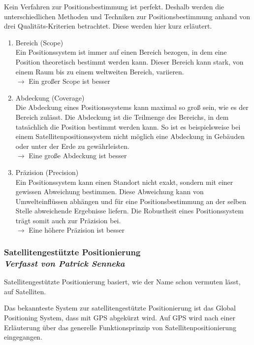 Kein Verfahren zur Positionsbestimmung ist perfekt. 
Deshalb werden die unterschiedlichen Methoden und Techniken zur Positionsbestimmung anhand von drei Qualitäts-Kriterien betrachtet. Diese werden hier kurz erläutert.

\begin{enumerate}
\item Bereich (Scope)\\
Ein Positionssystem ist immer auf einen Bereich bezogen, in dem eine Position theoretisch bestimmt werden kann. Dieser Bereich kann stark, von einem Raum bis zu einem weltweiten Bereich, variieren.\\
$\longrightarrow$ Ein großer Scope ist besser
\item Abdeckung (Coverage)\\
Die Abdeckung eines Positionssystems kann maximal so groß sein, wie es der Bereich zulässt. Die Abdeckung ist die Teilmenge des Bereichs, in dem tatsächlich die Position bestimmt werden kann. So ist es beispielsweise bei einem Satellitenpositionssystem nicht möglich eine Abdeckung in Gebäuden oder unter der Erde zu gewährleisten.\\
$\longrightarrow$ Eine große Abdeckung ist besser
\item Präzision (Precision)\\
Ein Positionssystem kann einen Standort nicht exakt, sondern mit einer gewissen Abweichung bestimmen. Diese Abweichung kann von Umwelteinflüssen abhängen und für eine Positionsbestimmung an der selben Stelle abweichende Ergebnisse liefern. Die Robustheit eines Positionssystem trägt somit auch zur Präzision bei. \\
$\longrightarrow$ Eine höhere Präzision ist besser
\end{enumerate}
\cite[S.183]{Schiller2004}


\subsubsection[Satellitengestützte Positionierung]{Satellitengestützte Positionierung
 \\ \textnormal{\small{\textit {Verfasst von Patrick Senneka}}}}

Satellitengestützte Positionierung basiert, wie der Name schon vermuten lässt, auf Satelliten. 

Das bekannteste System zur satellitengestützte Positionierung ist das Global Positioning System, dass mit GPS abgekürzt wird. Auf GPS wird nach einer Erläuterung über das generelle Funktionsprinzip von Satellitenpositionierung eingegangen.

